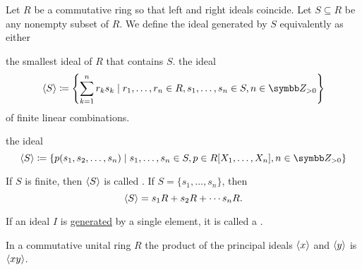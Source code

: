 \begin{definition}\label{def:generated_ring_ideal}
  Let \( R \) be a commutative ring so that left and right ideals coincide. Let \( S \subseteq R \) be any nonempty subset of \( R \). We define the ideal generated by \( S \) equivalently as either
  \begin{defenum}
     the smallest ideal of \( R \) that contains \( S \).
     the ideal
    \begin{equation*}
      \Gen S \coloneqq \left\{ \sum_{k=1}^n r_k s_k \mid r_1, \ldots, r_n \in R, s_1, \ldots, s_n \in S, n \in \BZ_{>0} \right\}
    \end{equation*}
    of finite linear combinations.

     the ideal
    \begin{equation*}
      \Gen S \coloneqq \left\{ p(s_1, s_2, \ldots, s_n) \mid s_1, \ldots, s_n \in S, p \in R[X_1, \ldots, X_n], n \in \BZ_{>0} \right\}
    \end{equation*}
  \end{defenum}

  If \( S \) is finite, then \( \left\langle S \right\rangle \) is called . If \( S = \{ s_1, \ldots, s_n \} \), then
  \begin{equation*}
    \left\langle S \right\rangle = s_1 R + s_2 R + \cdots s_n R.
  \end{equation*}
\end{definition}

\begin{definition}\label{def:principal_ideal}
  If an ideal \( I \) is \hyperref[def:generated_ring_ideal]{generated} by a single element, it is called a .
\end{definition}

\begin{proposition}\label{thm:product_of_principal_ideals}
  In a commutative unital ring \( R \) the product of the principal ideals \( \left\langle x \right\rangle \) and \( \left\langle y \right\rangle \) is \( \left\langle xy \right\rangle \).
\end{proposition}

